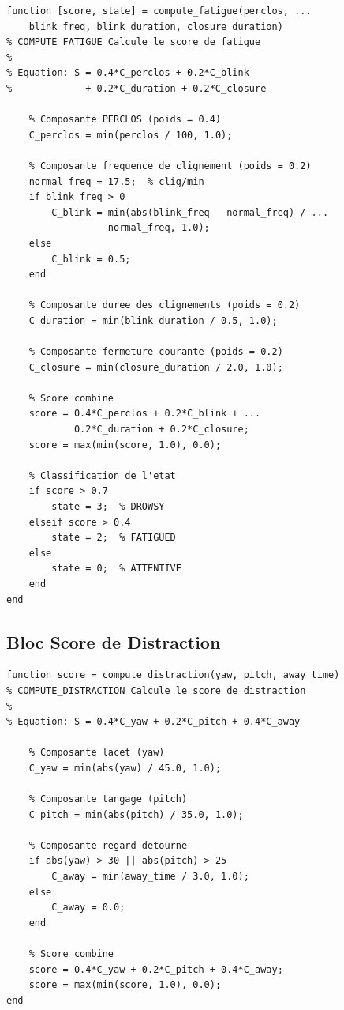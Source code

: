 \begin{lstlisting}[style=matlabstyle, caption={Calcul du score de fatigue en MATLAB.}, label={lst:fatigue_matlab}]
function [score, state] = compute_fatigue(perclos, ...
    blink_freq, blink_duration, closure_duration)
% COMPUTE_FATIGUE Calcule le score de fatigue
%
% Equation: S = 0.4*C_perclos + 0.2*C_blink 
%             + 0.2*C_duration + 0.2*C_closure

    % Composante PERCLOS (poids = 0.4)
    C_perclos = min(perclos / 100, 1.0);
    
    % Composante frequence de clignement (poids = 0.2)
    normal_freq = 17.5;  % clig/min
    if blink_freq > 0
        C_blink = min(abs(blink_freq - normal_freq) / ...
                  normal_freq, 1.0);
    else
        C_blink = 0.5;
    end
    
    % Composante duree des clignements (poids = 0.2)
    C_duration = min(blink_duration / 0.5, 1.0);
    
    % Composante fermeture courante (poids = 0.2)
    C_closure = min(closure_duration / 2.0, 1.0);
    
    % Score combine
    score = 0.4*C_perclos + 0.2*C_blink + ...
            0.2*C_duration + 0.2*C_closure;
    score = max(min(score, 1.0), 0.0);
    
    % Classification de l'etat
    if score > 0.7
        state = 3;  % DROWSY
    elseif score > 0.4
        state = 2;  % FATIGUED
    else
        state = 0;  % ATTENTIVE
    end
end
\end{lstlisting}

\subsection{Bloc Score de Distraction}

\begin{lstlisting}[style=matlabstyle, caption={Calcul du score de distraction en MATLAB.}, label={lst:distraction_matlab}]
function score = compute_distraction(yaw, pitch, away_time)
% COMPUTE_DISTRACTION Calcule le score de distraction
%
% Equation: S = 0.4*C_yaw + 0.2*C_pitch + 0.4*C_away

    % Composante lacet (yaw)
    C_yaw = min(abs(yaw) / 45.0, 1.0);
    
    % Composante tangage (pitch)
    C_pitch = min(abs(pitch) / 35.0, 1.0);
    
    % Composante regard detourne
    if abs(yaw) > 30 || abs(pitch) > 25
        C_away = min(away_time / 3.0, 1.0);
    else
        C_away = 0.0;
    end
    
    % Score combine
    score = 0.4*C_yaw + 0.2*C_pitch + 0.4*C_away;
    score = max(min(score, 1.0), 0.0);
end
\end{lstlisting}

